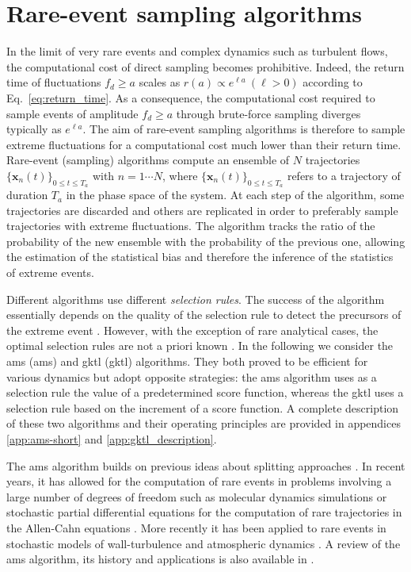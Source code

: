 \section{Rare-event sampling algorithms}
\label{sec:rare_events_algorithms}

%
In the limit of very rare events and complex dynamics such as turbulent flows, the computational cost of  direct sampling becomes prohibitive. Indeed, the return time of fluctuations $f_d \geq a$ scales as $r(a) \propto e^{\ell a}~(\ell>0)$ according to Eq.~\eqref{eq:return_time}.
As a consequence, the computational cost required to sample events of amplitude $f_d \geq a$ through brute-force sampling diverges typically as $e^{\ell a}$.
The aim of rare-event sampling algorithms is therefore to sample extreme fluctuations for a  computational cost much lower than their return time. 
%
Rare-event (sampling) algorithms compute an ensemble of $N$ trajectories $\{\mathbf{x}_n(t)\}_{0\leq t \leq T_a}$ with $n=1 \cdots N$, where $\{\mathbf{x}_n(t)\}_{0\leq t \leq T_a}$ refers to a trajectory of duration $T_a$ in the phase space of the system.
At each step of the algorithm, some trajectories are discarded and others are replicated in order to preferably sample trajectories with extreme fluctuations. The algorithm tracks the ratio of the probability of the new ensemble with the probability of the previous one, allowing the estimation of the statistical bias and therefore the inference of the statistics of extreme events. 

Different algorithms use different \emph{selection rules}. 
The success of the algorithm essentially depends on the quality of the selection rule to detect the precursors of the extreme event \citep{rolland_statistical_2015}. 
However, with the exception of rare analytical cases, the optimal selection rules are not a priori known \citep{lestang_computing_2018}. 
In the following we consider the \acl{ams} (\ac{ams}) and \acl{gktl} (\ac{gktl}) algorithms. They both proved to be efficient for various dynamics but adopt opposite strategies: the \ac{ams} algorithm uses as a selection rule the value of a predetermined score function, whereas the \ac{gktl} uses a selection rule based on the increment of a score function. A complete description of these two algorithms and their operating principles are provided in appendices \ref{app:ams-short} and \ref{app:gktl_description}.

%
The \ac{ams} algorithm \citep{cerou_adaptive_2007} builds on previous ideas about splitting approaches \citep{KahnHarris1951,glasserman_multilevel_1999}.  
In recent years, it has allowed for the computation of rare events in problems involving a large number of degrees of freedom such as molecular dynamics simulations \citep{aristoff_adaptive_2015,teo_adaptive_2016}
or stochastic partial differential equations for the computation of rare trajectories in the Allen-Cahn equations \citep{rolland_computing_2016}. 
%
 More recently it has been applied to rare events in stochastic models of wall-turbulence \citep{rolland_extremely_2018} and atmospheric dynamics \citep{bouchet2019rare}. A review of the \ac{ams} algorithm, its history and applications is also available in \citep{cerou2019adaptive}. 
%

